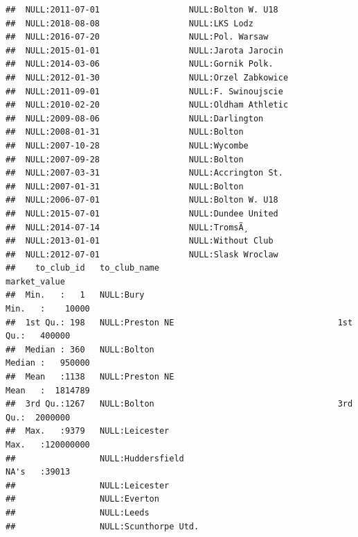 \documentclass{article}\usepackage[]{graphicx}\usepackage[]{color}
\makeatletter
\newenvironment{kframe}{%
 \def\at@end@of@kframe{}%
 \ifinner\ifhmode%
  \def\at@end@of@kframe{\end{minipage}}%
  \begin{minipage}{\columnwidth}%
 \fi\fi%
 \def\FrameCommand##1{\hskip\@totalleftmargin \hskip-\fboxsep
 \colorbox{shadecolor}{##1}\hskip-\fboxsep
     \hskip-\linewidth \hskip-\@totalleftmargin \hskip\columnwidth}%
 \MakeFramed {\advance\hsize-\width
   \@totalleftmargin\z@ \linewidth\hsize
   \@setminipage}}%
 {\par\unskip\endMakeFramed%
 \at@end@of@kframe}
\newenvironment{knitrout}{}{} %
\makeatother
\begin{document}
\begin{knitrout}
\begin{kframe}
\begin{verbatim}
##  NULL:2011-07-01                  NULL:Bolton W. U18                             
##  NULL:2018-08-08                  NULL:LKS Lodz                                  
##  NULL:2016-07-20                  NULL:Pol. Warsaw                               
##  NULL:2015-01-01                  NULL:Jarota Jarocin                            
##  NULL:2014-03-06                  NULL:Gornik Polk.                              
##  NULL:2012-01-30                  NULL:Orzel Zabkowice                           
##  NULL:2011-09-01                  NULL:F. Swinoujscie                            
##  NULL:2010-02-20                  NULL:Oldham Athletic                           
##  NULL:2009-08-06                  NULL:Darlington                                
##  NULL:2008-01-31                  NULL:Bolton                                    
##  NULL:2007-10-28                  NULL:Wycombe                                   
##  NULL:2007-09-28                  NULL:Bolton                                    
##  NULL:2007-03-31                  NULL:Accrington St.                            
##  NULL:2007-01-31                  NULL:Bolton                                    
##  NULL:2006-07-01                  NULL:Bolton W. U18                             
##  NULL:2015-07-01                  NULL:Dundee United                             
##  NULL:2014-07-14                  NULL:TromsÃ¸                                   
##  NULL:2013-01-01                  NULL:Without Club                              
##  NULL:2012-07-01                  NULL:Slask Wroclaw                             
##    to_club_id   to_club_name                                     market_value      
##  Min.   :   1   NULL:Bury                                       Min.   :    10000  
##  1st Qu.: 198   NULL:Preston NE                                 1st Qu.:   400000  
##  Median : 360   NULL:Bolton                                     Median :   950000  
##  Mean   :1138   NULL:Preston NE                                 Mean   :  1814789  
##  3rd Qu.:1267   NULL:Bolton                                     3rd Qu.:  2000000  
##  Max.   :9379   NULL:Leicester                                  Max.   :120000000  
##                 NULL:Huddersfield                               NA's   :39013      
##                 NULL:Leicester                                                     
##                 NULL:Everton                                                       
##                 NULL:Leeds                                                         
##                 NULL:Scunthorpe Utd.                                               

\end{verbatim}
\end{kframe}
\end{knitrout}
\end{document}
